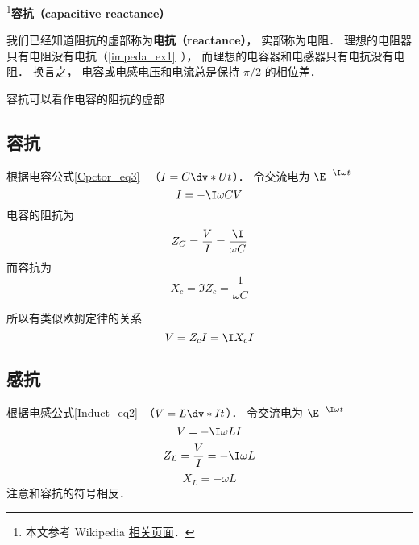 
\begin{issues}
\issueDraft
\end{issues}


\footnote{本文参考 Wikipedia \href{https://en.wikipedia.org/wiki/Electrical_reactance}{相关页面}．}\textbf{容抗（capacitive reactance）}

我们已经知道阻抗的虚部称为\textbf{电抗（reactance）}， 实部称为电阻． 理想的电阻器只有电阻没有电抗（\autoref{impeda_ex1}~）， 而理想的电容器和电感器只有电抗没有电阻． 换言之， 电容或电感电压和电流总是保持 $\pi/2$ 的相位差．

容抗可以看作电容的阻抗的虚部

\subsection{容抗}
根据电容公式\autoref{Cpctor_eq3}~ （$I = C\dv*{U}{t}$）． 令交流电为 $\E^{-\I \omega t}$
\begin{equation}
I = -\I \omega CV
\end{equation}
电容的阻抗为
\begin{equation}
Z_C = \frac{V}{I} = \frac{\I}{\omega C}
\end{equation}
而容抗为
\begin{equation}
X_c = \Im{Z_c} = \frac{1}{\omega C}
\end{equation}

所以有类似欧姆定律的关系
\begin{equation}
V = Z_c I = \I X_c I
\end{equation}

\subsection{感抗}
根据电感公式\autoref{Induct_eq2}~（$V = L\dv*{I}{t}$）． 令交流电为 $\E^{-\I \omega t}$
\begin{equation}
V = -\I\omega L I
\end{equation}
\begin{equation}
Z_L = \frac{V}{I} = -\I\omega L
\end{equation}
\begin{equation}
X_L = -\omega L
\end{equation}
注意和容抗的符号相反．
